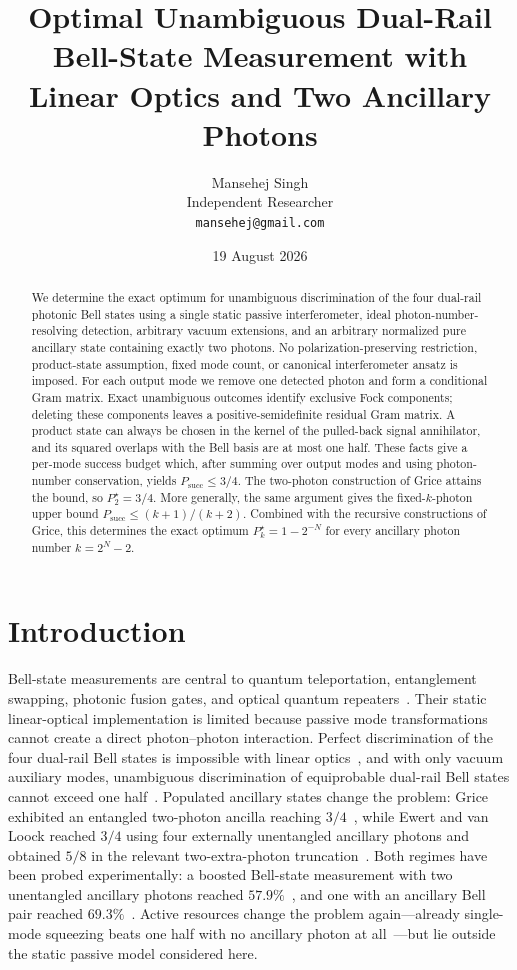 \documentclass[11pt]{article}
\title{\textbf{Optimal Unambiguous Dual-Rail Bell-State Measurement with Linear Optics and Two Ancillary Photons}}
\author{Mansehej Singh\\[2pt]
  \normalsize Independent Researcher\\[1pt]
  \normalsize\texttt{mansehej@gmail.com}}
\date{19 August 2026}
\theoremstyle{remark}
\begin{document}
\maketitle

\begin{abstract}
We determine the exact optimum for unambiguous discrimination of the four
dual-rail photonic Bell states using a single static passive interferometer,
ideal photon-number-resolving detection, arbitrary vacuum extensions, and an
arbitrary normalized pure ancillary state containing exactly two photons. No
polarization-preserving restriction, product-state assumption, fixed mode
count, or canonical interferometer ansatz is imposed. For each output mode we
remove one detected photon and form a conditional Gram matrix. Exact
unambiguous outcomes identify exclusive Fock components; deleting these
components leaves a positive-semidefinite residual Gram matrix. A product state
can always be chosen in the kernel of the pulled-back signal annihilator, and
its squared overlaps with the Bell basis are at most one half. These facts give
a per-mode success budget which, after summing over output modes and using
photon-number conservation, yields
\(P_{\mathrm{succ}}\le 3/4\). The two-photon construction of Grice attains
the bound, so \(P_2^\star=3/4\). More generally, the same argument gives the
fixed-\(k\)-photon upper bound
\(P_{\mathrm{succ}}\le (k+1)/(k+2)\). Combined with the recursive
constructions of Grice, this determines the exact optimum
\(P_k^\star=1-2^{-N}\) for every ancillary photon number \(k=2^N-2\).
\end{abstract}

\section{Introduction}

Bell-state measurements are central to quantum teleportation, entanglement
swapping, photonic fusion gates, and optical quantum
repeaters~\cite{Bartolucci2023}. Their static linear-optical implementation
is limited because passive mode transformations cannot create a direct
photon--photon interaction. Perfect discrimination of the four dual-rail
Bell states is impossible with linear
optics~\cite{Vaidman1999,Lutkenhaus1999}, and with only vacuum auxiliary
modes, unambiguous discrimination of equiprobable dual-rail Bell states cannot
exceed one half~\cite{Calsamiglia2001}. Populated ancillary states change the
problem: Grice exhibited an entangled two-photon ancilla reaching
\(3/4\)~\cite{Grice2011}, while Ewert and van Loock reached \(3/4\) using four
externally unentangled ancillary photons and obtained \(5/8\) in the relevant
two-extra-photon truncation~\cite{Ewert2014}. Both regimes have been probed
experimentally: a boosted Bell-state measurement with two unentangled
ancillary photons reached \(57.9\%\)~\cite{Bayerbach2023}, and one with an
ancillary Bell pair reached \(69.3\%\)~\cite{Hauser2024}. Active resources
change the problem again---already single-mode squeezing beats one half with
no ancillary photon at all~\cite{Zaidi2013}---but lie outside the static
passive model considered here.
\end{document}
